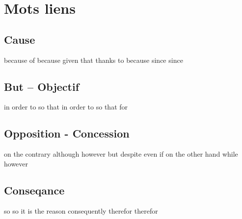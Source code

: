 \section{Mots liens}
\subsection*{Cause}
   {because of}
   {because}
   {given that}
   {thanks to}
   {because}
   {since}
   {since}
\subsection*{But -- Objectif}
   {in order to}
   {so that}
   {in order to}
   {so that}
   {for}
\subsection*{Opposition - Concession}
   {on the contrary}
   {although}
   {however}
   {but}
   {despite}
   {even if}
   {on the other hand}
   {while}
   {however}
\subsection*{Conseqance}
   {so}
   {so}
   {it is the reason}
   {}
   {consequently}
   {therefor}
   {therefor}

